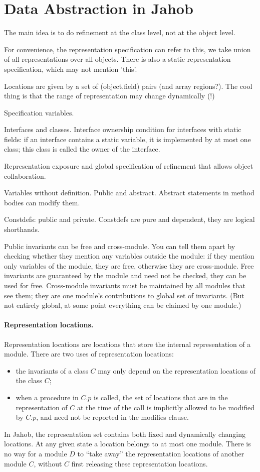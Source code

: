 \section{Data Abstraction in Jahob}

The main idea is to do refinement at the class level,
not at the object level.

For convenience, the representation specification can
refer to this, we take union of all representations over
all objects.  There is also a static representation specification,
which may not mention 'this'.


Locations are given by a set of
(object,field) pairs (and array regions?).
The cool thing is that the range of representation may change dynamically (!)

Specification variables.

Interfaces and classes.  Interface ownership condition for
interfaces with static fields: if an interface contains a
static variable, it is implemented by at most one class;
this class is called the owner of the interface.

Representation exposure and global specification of refinement
that allows object collaboration.

Variables without definition.  Public and abstract.  Abstract
statements in method bodies can modify them.

Constdefs: public and private.  Constdefs are pure and dependent, they
are logical shorthands.

Public invariants can be free and cross-module.  You can tell them
apart by checking whether they mention any variables outside the module: if they
mention only variables of the module, they are free, otherwise they are cross-module.
Free invariants are guaranteed by the module and need not be checked,
they can be used for free.  Cross-module invariants must be maintained
by all modules that see them; they are one module's contributions to
global set of invariants.  (But not entirely global, at some point everything
can be claimed by one module.)

\paragraph{Representation locations.}
Representation locations are locations that store the internal
representation of a module.  There are two uses of representation
locations:
\begin{itemize}
\item the invariants of a class $C$ may only depend on the representation
locations of the class $C$;
\item when a procedure in $C.p$ is called, the set of locations that are
in the representation of $C$ at the time of the call is implicitly allowed
to be modified by $C.p$, and need not be reported in the modifies clause.
\end{itemize}
In Jahob, the representation set contains both fixed and dynamically
changing locations.  At any given state a location belongs to at most
one module.  There is no way for a module $D$ to ``take away'' the
representation locations of another module $C$, without $C$ first
releasing these representation locations.

